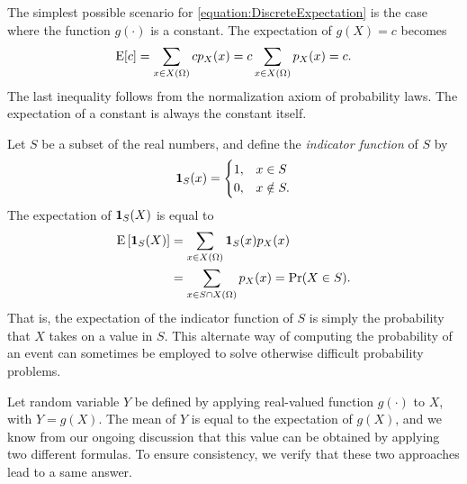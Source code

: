 \begin{example}
The simplest possible scenario for \eqref{equation:DiscreteExpectation} is the case where the function $g(\cdot)$ is a constant.
The expectation of $g(X) = c$ becomes
\begin{equation*}
\mathrm{E} [ c ]
= \sum_{x \in X(\Omega)} c p_X (x)
= c \sum_{x \in X(\Omega)} p_X (x)
= c .
\end{equation*}
The last inequality follows from the normalization axiom of probability laws.
The expectation of a constant is always the constant itself.
\end{example}

\begin{example}
Let $S$ be a subset of the real numbers, and define the \emph{indicator function} of $S$ by 
\begin{equation*}
\mathbf{1}_S (x) = \begin{cases} 1, & x \in S\\
0, & x \notin S . \end{cases}
\end{equation*}
The expectation of $\mathbf{1}_S (X)$ is equal to
\begin{equation*}
\begin{split}
\mathrm{E} \left[ \mathbf{1}_S (X) \right]
&= \sum_{x \in X(\Omega)} \mathbf{1}_S (x) p_X(x) \\
&= \sum_{x \in S \cap X(\Omega)} p_X(x)
= \Pr (X \in S) .
\end{split}
\end{equation*}
That is, the expectation of the indicator function of $S$ is simply the probability that $X$ takes on a value in $S$.
This alternate way of computing the probability of an event can sometimes be employed to solve otherwise difficult probability problems.
\end{example}

Let random variable $Y$ be defined by applying real-valued function $g(\cdot)$ to $X$, with $Y = g(X)$.
The mean of $Y$ is equal to the expectation of $g(X)$, and we know from our ongoing discussion that this value can be obtained by applying two different formulas.
To ensure consistency, we verify that these two approaches lead to a same answer.

